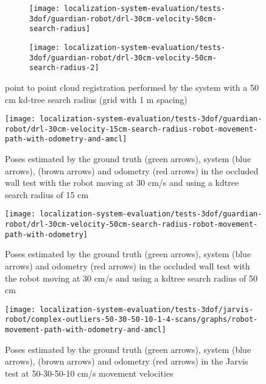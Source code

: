 \begin{figure}[H]
	\centering
	\begin{subfigure}[ht]{0.425\textwidth}
		\centering
		\texttt{[image: localization-system-evaluation/tests-3dof/guardian-robot/drl-30cm-velocity-50cm-search-radius]}
	\end{subfigure}
	\begin{subfigure}[ht]{0.425\textwidth}
		\centering
		\texttt{[image: localization-system-evaluation/tests-3dof/guardian-robot/drl-30cm-velocity-50cm-search-radius-2]}
	\end{subfigure}
	\caption{ point to point cloud registration performed by the  system with a 50 cm kd-tree search radius (grid with 1 m spacing)}
	\label{fig:localization-system-evaluation_guardian-drl-30cm-velocity-50cm-search-radius}
\end{figure}


\begin{figure}[H]
	\centering
	\texttt{[image: localization-system-evaluation/tests-3dof/guardian-robot/drl-30cm-velocity-15cm-search-radius-robot-movement-path-with-odometry-and-amcl]}
	\caption{Poses estimated by the ground truth (green arrows),  system (blue arrows),  (brown arrows) and odometry (red arrows) in the occluded wall test with the robot moving at 30 cm/s and using a kdtree search radius of 15 cm}
	\label{fig:localization-system-evaluation_guardian-drl-30cm-velocity-15cm-search-radius-path}
\end{figure}

\begin{figure}[H]
	\centering
	\texttt{[image: localization-system-evaluation/tests-3dof/guardian-robot/drl-30cm-velocity-50cm-search-radius-robot-movement-path-with-odometry]}
	\caption{Poses estimated by the ground truth (green arrows),  system (blue arrows) and odometry (red arrows) in the occluded wall test with the robot moving at 30 cm/s and using a kdtree search radius of 50 cm}
	\label{fig:localization-system-evaluation_guardian-drl-30cm-velocity-50cm-search-radius-path}
\end{figure}


\begin{figure}[H]
	\centering
	\texttt{[image: localization-system-evaluation/tests-3dof/jarvis-robot/complex-outliers-50-30-50-10-1-4-scans/graphs/robot-movement-path-with-odometry-and-amcl]}
	\caption{Poses estimated by the ground truth (green arrows),  system (blue arrows),  (brown arrows) and odometry (red arrows) in the Jarvis test at 50-30-50-10 cm/s movement velocities}
	\label{fig:localization-system-evaluation_complex-path-with-outliers-50-30-50-10cm-per-sec-velocity-1-4-scans-paths}
\end{figure}

